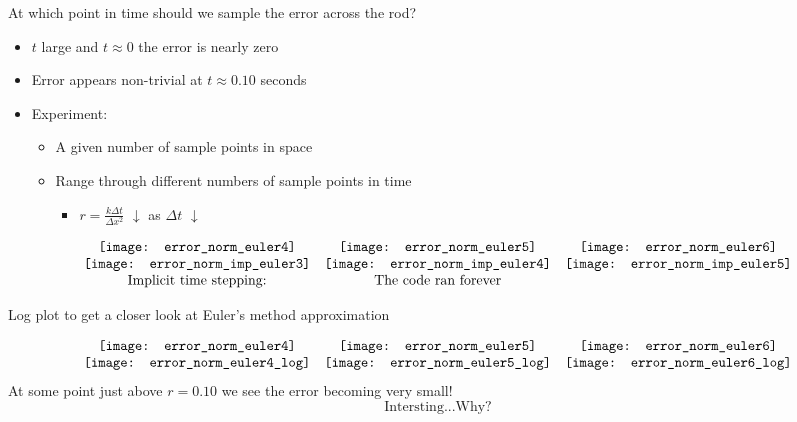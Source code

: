 \documentclass[compress]{beamer}
\begin{document}
\begin{frame}
At which point in time should we sample the error across the rod?
\begin{itemize}
\item $t$ large and $t\approx 0$ the error is nearly zero
\item Error appears non-trivial at $t\approx 0.10$ seconds
\item Experiment:
\begin{itemize}
\item A given number of sample points in space
\item Range through different numbers of sample points in time
\begin{itemize}
\item $r=\frac{k\Delta t}{\Delta x^2}$ $\downarrow$ \hspace{.1in} as $\Delta t$ $\downarrow$
\end{itemize}
\end{itemize}
\end{itemize}
\end{frame}


\begin{frame}
\[
\begin{array}{c c c}
\texttt{[image: error\_norm\_euler4]} 	&	\texttt{[image: error\_norm\_euler5]}	&	\texttt{[image: error\_norm\_euler6]}		\\
\texttt{[image: error\_norm\_imp\_euler3]} 	&	\texttt{[image: error\_norm\_imp\_euler4]}	&	\texttt{[image: error\_norm\_imp\_euler5]}			\\
\text{Implicit time stepping:}		&	\text{The code ran forever}		&	
\end{array}
\]
\end{frame}

\begin{frame}
\begin{center}
Log plot to get a closer look at Euler's method approximation
\end{center}
\[
\begin{array}{c c c}
\texttt{[image: error\_norm\_euler4]} 	&	\texttt{[image: error\_norm\_euler5]}	&	\texttt{[image: error\_norm\_euler6]}		\\
\texttt{[image: error\_norm\_euler4\_log]}		&	\texttt{[image: error\_norm\_euler5\_log]}		&	\texttt{[image: error\_norm\_euler6\_log]}	
\end{array}
\]
At some point just above $r=0.10$ we see the error becoming very small!
\[
\text{Intersting...Why?}
\]
\end{frame}
\end{document}
